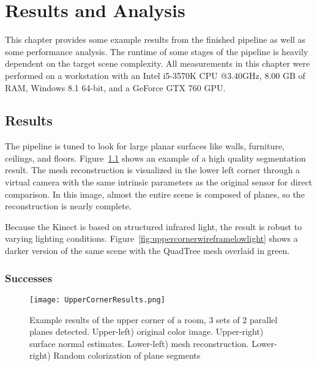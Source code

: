 
\chapter{Results and Analysis}
\label{chap:analysis}
This chapter provides some example results from the finished pipeline as well as some performance analysis. The runtime of some stages of the pipeline is heavily dependent on the target scene complexity. All measurements in this chapter were performed on a workstation with an Intel i5-3570K CPU @3.40GHz, 8.00 GB of RAM, Windows 8.1 64-bit, and a GeForce GTX 760 GPU. \par 

\section{Results}
The pipeline is tuned to look for large planar surfaces like walls, furniture, ceilings, and floors. Figure~\ref{fig:uppercorner} shows an example of a high quality segmentation result. The mesh reconstruction is visualized in the lower left corner through a virtual camera with the same intrinsic parameters as the original sensor for direct comparison. In this image, almost the entire scene is composed of planes, so the reconstruction is nearly complete.\par 
Because the Kinect is based on structured infrared light, the result is robust to varying lighting conditions. Figure~\ref{fig:uppercornerwireframelowlight} shows a darker version of the same scene with the QuadTree mesh overlaid in green.
\subsection{Successes}
\begin{figure}[!htpb]
    \centering
    \texttt{[image: UpperCornerResults.png]}
    \caption{Example results of the upper corner of a room, 3 sets of 2 parallel planes detected.  Upper-left) original color image. Upper-right) surface normal estimates. Lower-left) mesh reconstruction. Lower-right) Random colorization of plane segments}
    \label{fig:uppercorner}
\end{figure}

